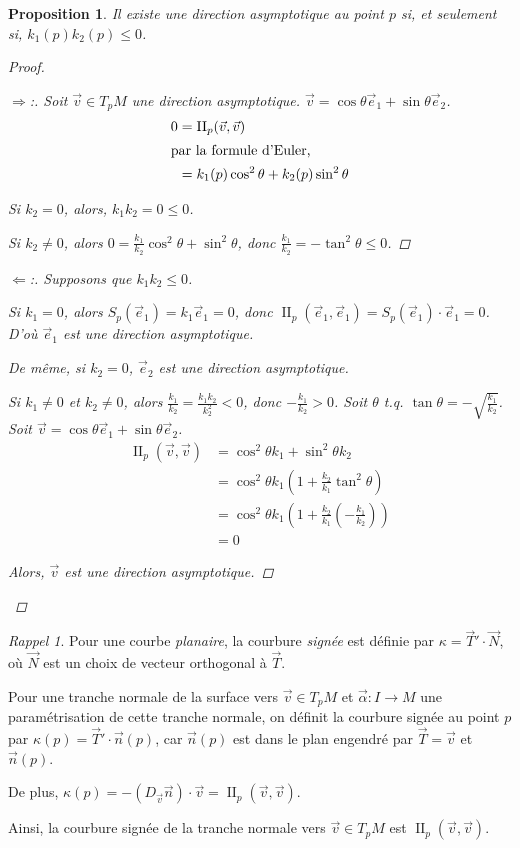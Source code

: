 \documentclass{report}
\newtheorem*{prop}{Proposition}
\theoremstyle{definition}
\theoremstyle{remark}
\newtheorem*{rapp}{Rappel}
\newenvironment*{subproof}[1][D\'emonstration]
{
\begin{proof}[#1]

}
{
\renewcommand{\qedsymbol}{$\blacksquare$}
\end{proof}
\renewcommand{\qedsymbol}{$\square$}
}
\def\lte{\leqslant}
\def\dff{\operatorname{II}}
\begin{document}
	\begin{prop}
		Il existe une direction asymptotique au point $p$ si, et seulement si, $k_1(p)k_2(p)\lte0$.
		\begin{proof}
			\begin{subproof}[$\Rightarrow$:]
				Soit $\vec v\in T_pM$ une direction asymptotique. $\vec v=\cos\theta\vec e_1+\sin\theta\vec e_2$.
				\begin{align*}
					0&= \dff_p(\vec v,\vec v)\\
					\shortintertext{par la formule d'Euler,}
					&= k_1(p)\cos^2\theta+k_2(p)\sin^2\theta
				\end{align*}

				Si $k_2=0$, alors, $k_1k_2=0\lte0$.

				Si $k_2\neq0$, alors $0 = \frac{k_1}{k_2}\cos^2\theta+\sin^2\theta$, donc $\frac{k_1}{k_2}=-\tan^2\theta\lte0$.
			\end{subproof}
			\begin{subproof}[$\Leftarrow$:]
				Supposons que $k_1k_2\lte0$.

				Si $k_1=0$, alors $S_p(\vec e_1)=k_1\vec e_1=0$, donc $\dff_p(\vec e_1,\vec e_1) = S_p(\vec e_1)\cdot\vec e_1=0$. D'o\`u $\vec e_1$ est une direction asymptotique.

				De m\^eme, si $k_2=0$, $\vec e_2$ est une direction asymptotique.

				Si $k_1\neq0$ et $k_2\neq0$, alors $\frac{k_1}{k_2} = \frac{k_1k_2}{k_2^2} < 0$, donc $-\frac{k_1}{k_2}>0$. Soit $\theta$ t.q. $\tan\theta=-\sqrt{\frac{k_1}{k_2}}$. Soit $\vec v=\cos\theta\vec e_1+\sin\theta\vec e_2$.
				\begin{align*}
					\dff_p(\vec v,\vec v)&= \cos^2\theta k_1+\sin^2\theta k_2\\
					&= \cos^2\theta k_1 \left( 1+\frac{k_2}{k_1}\tan^2\theta \right)\\
					&= \cos^2\theta k_1 \left( 1+\frac{k_2}{k_1} \left( -\frac{k_1}{k_2} \right) \right)\\
					&= 0
				\end{align*}

				Alors, $\vec v$ est une direction asymptotique.
			\end{subproof}
		\end{proof}
	\end{prop}

	\begin{rapp}
		Pour une courbe \emph{planaire}, la courbure \emph{sign\'ee} est d\'efinie par $\kappa=\vec T'\cdot\vec N$, o\`u $\vec N$ est un choix de vecteur orthogonal \`a $\vec T$.

		Pour une tranche normale de la surface vers $\vec v\in T_pM$ et $\vec\alpha:I\to M$ une param\'etrisation de cette tranche normale, on d\'efinit la courbure sign\'ee au point $p$ par $\kappa(p) = \vec T' \cdot \vec n(p)$, car $\vec n(p)$ est dans le plan engendr\'e par $\vec T=\vec v$ et $\vec n(p)$.

		De plus, $\kappa(p) = -(D_{\vec v}\vec n)\cdot\vec v = \dff_p(\vec v,\vec v)$.

		Ainsi, la courbure sign\'ee de la tranche normale vers $\vec v\in T_pM$ est $\dff_p(\vec v,\vec v)$.
	\end{rapp}
\end{document}
